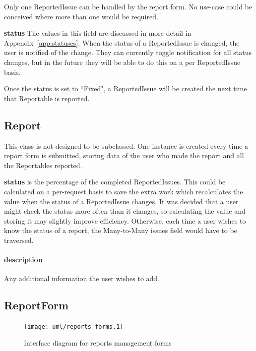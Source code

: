 Only one ReportedIssue can be handled by the report form. No use-case could be conceived where more than one would be required.

\textbf{status} The values in this field are discussed in more detail in Appendix~\ref{app:statuses}. When the status of a ReportedIssue is changed, the user is notified of the change. They can currently toggle notification for all status changes, but in the future they will be able to do this on a per ReportedIssue basis.

Once the status is set to ``Fixed", a ReportedIssue will be created the next time that Reportable is reported.

\subsection{Report}
This class is not designed to be subclassed. One instance is created every time a report form is submitted, storing data of the user who made the report and all the Reportables reported.

\textbf{status} is the percentage of the completed ReportedIssues. This could be calculated on a per-request basis to save the extra work which recalculates the value when the status of a ReportedIssue changes. It was decided that a user might check the status more often than it changes, so calculating the value and storing it may slightly improve efficiency. Otherwise, each time a user wishes to know the status of a report, the Many-to-Many issues field would have to be traversed.
\paragraph{description} Any additional information the user wishes to add.

\subsection{ReportForm}
\label{sec:rm:reportform}

\begin{figure}
\centering
\texttt{[image: uml/reports-forms.1]}
\caption{Interface diagram for reports management forms}
\label{fig:rm:forms}
\end{figure}

